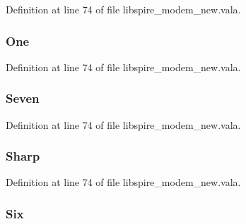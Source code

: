 Definition at line 74 of file libspire\-\_\-modem\-\_\-new.\-vala.

\hypertarget{libspire__modem__new_8vala_a5fa00e7f98097a9c0c059b5308a4b863}{
\subsubsection[{One}]{\setlength{\rightskip}{0pt plus 5cm}One}}\label{libspire__modem__new_8vala_a5fa00e7f98097a9c0c059b5308a4b863}


Definition at line 74 of file libspire\-\_\-modem\-\_\-new.\-vala.

\hypertarget{libspire__modem__new_8vala_a664c9d9eff9f8aedc5d91b3bc6625968}{
\subsubsection[{Seven}]{\setlength{\rightskip}{0pt plus 5cm}Seven}}\label{libspire__modem__new_8vala_a664c9d9eff9f8aedc5d91b3bc6625968}


Definition at line 74 of file libspire\-\_\-modem\-\_\-new.\-vala.

\hypertarget{libspire__modem__new_8vala_a2c88735882fca7962e70190bc67e5514}{
\subsubsection[{Sharp}]{\setlength{\rightskip}{0pt plus 5cm}Sharp}}\label{libspire__modem__new_8vala_a2c88735882fca7962e70190bc67e5514}


Definition at line 74 of file libspire\-\_\-modem\-\_\-new.\-vala.

\hypertarget{libspire__modem__new_8vala_af327dfd1bc2e2ab345c37f6830271498}{
\subsubsection[{Six}]{\setlength{\rightskip}{0pt plus 5cm}Six}}\label{libspire__modem__new_8vala_af327dfd1bc2e2ab345c37f6830271498}


